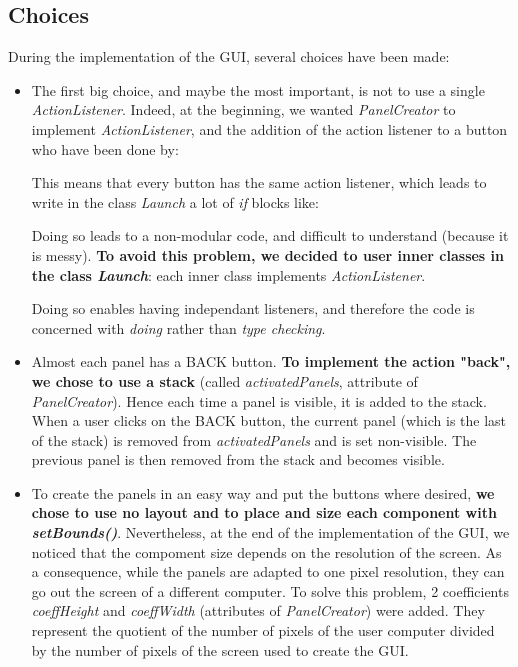 \subsection{Choices}
\label{sub:choices}
During the implementation of the GUI, several choices have been made:
\begin{itemize}
	\item The first big choice, and maybe the most important, is not to use a single \textit{ActionListener}. Indeed, at the beginning, we wanted \textit{PanelCreator} to implement \textit{ActionListener}, and the addition of the action listener to a button who have been done by:

This means that every button has the same action listener, which leads to write in the class \textit{Launch} a lot of \textit{if} blocks like:

Doing so leads to a non-modular code, and difficult to understand (because it is messy). \textbf{To avoid this problem, we decided to user inner classes in the class \textit{Launch}}: each inner class implements \textit{ActionListener}.

Doing so enables having independant listeners, and therefore the code is concerned with \textit{doing} rather than \textit{type checking}.

	\item Almost each panel has a BACK button. \textbf{To implement the action "back", we chose to use a stack} (called \textit{activatedPanels}, attribute of \textit{PanelCreator}). Hence each time a panel is visible, it is added to the stack. When a user clicks on the BACK button, the current panel (which is the last of the stack) is removed from \textit{activatedPanels} and is set non-visible. The previous panel is then removed from the stack and becomes visible.
	
	\item To create the panels in an easy way and put the buttons where desired, \textbf{we chose to use no layout and to place and size each component with \textit{setBounds()}}. Nevertheless, at the end of the implementation of the GUI, we noticed that the compoment size depends on the resolution of the screen. As a consequence, while the panels are adapted to one pixel resolution, they can go out the screen of a different computer. To solve this problem, 2 coefficients \textit{coeffHeight} and \textit{coeffWidth} (attributes of \textit{PanelCreator}) were added. They represent the quotient of the number of pixels of the user computer divided by the number of pixels of the screen used to create the GUI.
	

\end{itemize}
